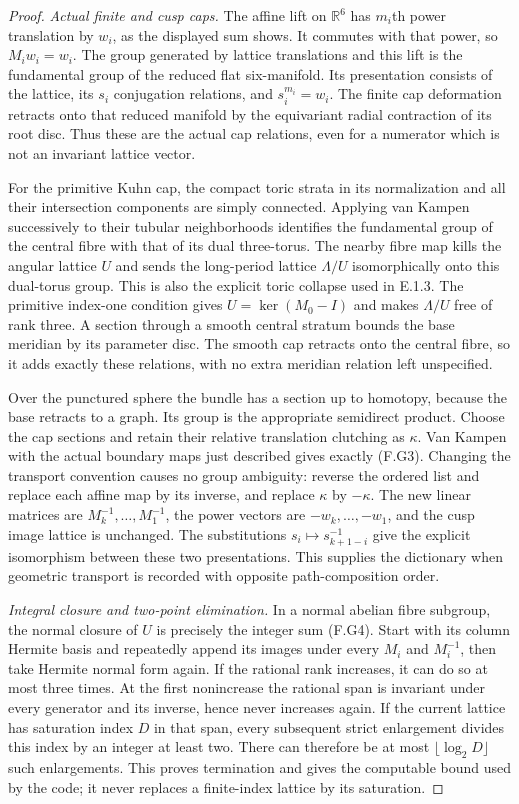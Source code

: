 \begin{proof}
\emph{Actual finite and cusp caps.}
The affine lift on $\mathbb R^6$ has $m_i$th power translation by
$w_i$, as the displayed sum shows.  It commutes with that power,
so $M_iw_i=w_i$.  The group generated by lattice translations
and this lift is the fundamental group of the reduced flat
six-manifold.  Its presentation consists of the lattice, its
$s_i$ conjugation relations, and $s_i^{m_i}=w_i$.
The finite cap deformation retracts onto that reduced manifold
by the equivariant radial contraction of its root disc.
Thus these are the actual cap relations, even for a numerator
which is not an invariant lattice vector.

For the primitive Kuhn cap, the compact toric strata in its
normalization and all their intersection components are simply
connected.  Applying van Kampen successively to their tubular
neighborhoods identifies the fundamental group of the central
fibre with that of its dual three-torus.  The nearby fibre map
kills the angular lattice $U$ and sends the long-period lattice
$\Lambda/U$ isomorphically onto this dual-torus group.  This is
also the explicit toric collapse used in E.1.3.  The primitive
index-one condition gives $U=\ker(M_0-I)$ and makes $\Lambda/U$
free of rank three.  A section through a smooth central stratum
bounds the base meridian by its parameter disc.  The smooth cap
retracts onto the central fibre, so it adds exactly these
relations, with no extra meridian relation left unspecified.

Over the punctured sphere the bundle has a section up to homotopy,
because the base retracts to a graph.  Its group is the appropriate
semidirect product.  Choose the cap sections and retain their
relative translation clutching as $\kappa$.  Van Kampen with the
actual boundary maps just described gives exactly (F.G3).
Changing the transport convention causes no group ambiguity:
reverse the ordered list and replace each affine map by its
inverse, and replace $\kappa$ by $-\kappa$.  The new linear
matrices are $M_k^{-1},\ldots,M_1^{-1}$, the power vectors are
$-w_k,\ldots,-w_1$, and the cusp image lattice is unchanged.
The substitutions $s_i\mapsto s_{k+1-i}^{-1}$ give the explicit
isomorphism between these two presentations.  This supplies the
dictionary when geometric transport is recorded with opposite
path-composition order.

\emph{Integral closure and two-point elimination.}
In a normal abelian fibre subgroup, the normal closure of $U$
is precisely the integer sum (F.G4).  Start with its column
Hermite basis and repeatedly append its images under every
$M_i$ and $M_i^{-1}$, then take Hermite normal form again.
If the rational rank increases, it can do so at most three
times.  At the first nonincrease the rational span is invariant
under every generator and its inverse, hence never increases
again.  If the current lattice has saturation index $D$ in
that span, every subsequent strict enlargement divides this
index by an integer at least two.  There can therefore be at
most $\lfloor\log_2D\rfloor$ such enlargements.  This proves
termination and gives the computable bound used by the code;
it never replaces a finite-index lattice by its saturation.


\end{proof}
